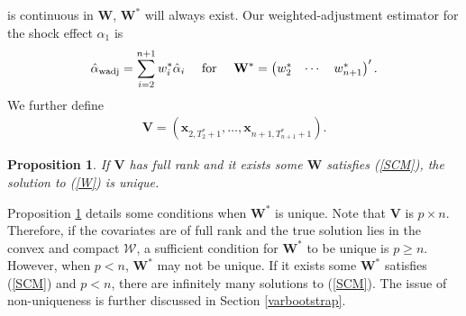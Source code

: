 \documentclass[11pt]{article}
\def\mbf#1{\mathbf{#1}} %
\newtheorem{prop}{Proposition}
\theoremstyle{definition}
\begin{document}
is continuous in $\mbf{W}$, $\mbf{W}^*$ will always exist. %
Our weighted-adjustment estimator for the shock effect $\alpha_1$ is
  \begin{align*}
    \hat{\alpha}_{\rm wadj} = \sum_{i=2}^{n+1} w_i^*\hat{\alpha}_i
    \quad \text{ for } \quad \mbf{W}^* = \begin{pmatrix}
      w^*_2 & \cdots & w^*_{n+1}
    \end{pmatrix}'.
  \end{align*}
 We further define
\begin{align*}
  \mathbf{V} = (\mathbf{x}_{2, T_2^*+1}, \ldots,\mathbf{x}_{n+1, T_{n+1}^*+1}).
\end{align*}
\begin{prop}
  \label{uniqueness} If $\mathbf{V}$ has full rank and it exists some $\mathbf{W}$ satisfies (\ref{SCM}), the solution to  (\ref{W}) is unique.
\end{prop} 
Proposition \ref{uniqueness} details some conditions when $\mathbf{W}^*$ is unique.  Note that $\mathbf{V}$ is $p \times n$. Therefore, if the covariates are of full rank and the true solution lies in the convex and compact $\mathcal{W}$, a sufficient condition for $\mathbf{W}^*$ to be unique is $p \geq n$. However, when $p < n$, $\mathbf{W}^*$ may not be unique. If it exists some $\mathbf{W}^*$ satisfies (\ref{SCM}) and $p < n$, there are infinitely many solutions to (\ref{SCM}).  The issue of non-uniqueness is further discussed in Section \ref{varbootstrap}.
\end{document}
